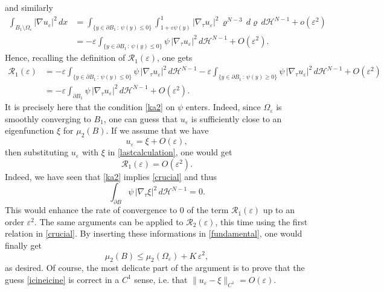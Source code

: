\documentclass{amsart}
\theoremstyle{definition}
\numberwithin{equation}{section}
\begin{document}
and similarly
\[
\begin{split}
\int_{B_1\setminus \Omega_\varepsilon}|\nabla u_\varepsilon|^2\, dx
&=\int_{\{y\in\partial B_1\,:\, \psi(y)\le0 \}}\int_{1+\varepsilon\psi(y)}^1\left|\nabla_\tau u_\varepsilon\right|^2\,\varrho^{N-3}\,d\varrho\,d\mathcal{H}^{N-1}+o(\varepsilon^2)\\
&=-\varepsilon\int_{\{y\in\partial B_1\,:\, \psi(y)\le0 \}}\psi\,|\nabla_\tau u_\varepsilon|^2\, d\mathcal{H}^{N-1}+O(\varepsilon^2).
\end{split}
\]
Hence, recalling the definition of $\mathcal{R}_1(\varepsilon)$, one gets
\begin{equation}
\label{lastcalculation}
\begin{split}
\mathcal{R}_1(\varepsilon) &= -\varepsilon\int_{\{y\in\partial B_1\,:\, \psi(y)\le0 \}}\psi\,|\nabla_\tau u_\varepsilon|^2\, d\mathcal{H}^{N-1}-\varepsilon\int_{\{y\in\partial B_1\,:\, \psi(y)\ge0 \}}\psi\,|\nabla_\tau u_\varepsilon|^2\, d\mathcal{H}^{N-1}+O(\varepsilon^2)\\
&=-\varepsilon \int_{\partial B_1}\psi\,|\nabla_\tau u_\varepsilon|^2\,d\mathcal{H}^{N-1}+ O(\varepsilon^2).
\end{split}
\end{equation}
It is precisely here that the condition \eqref{ka2} on $\psi$ enters.
Indeed, since $\Omega_\varepsilon$ is smoothly converging to $B_1$, one can guess that $u_\varepsilon$ is sufficiently close to an eigenfunction $\xi$ for $\mu_2(B)$. 
If we assume that we have 
\begin{equation}
\label{icineicine}
u_\varepsilon=\xi+O(\varepsilon),
\end{equation}
then substituting $u_\varepsilon$ with $\xi$ in \eqref{lastcalculation}, one would get
\[
\mathcal{R}_1(\varepsilon)=O(\varepsilon^2).
\]
Indeed, we have seen that \eqref{ka2} implies \eqref{crucial} and thus
\[
\int_{\partial B} \psi\,|\nabla_\tau \xi|^2\,d\mathcal{H}^{N-1}=0.
\]
This would enhance the rate of convergence to $0$ of the term $\mathcal{R}_1(\varepsilon)$ up to an order $\varepsilon^2$. The same arguments can be applied to $\mathcal{R}_2(\varepsilon)$, this time using the first relation in \eqref{crucial}. By inserting these informations in \eqref{fundamental}, one would finally get
\[
\mu_2(B)\le \mu_2(\Omega_\varepsilon)+K\,\varepsilon^2,
\]
as desired. Of course, the most delicate part of the argument is to prove that the guess \eqref{icineicine} is correct in a $C^1$ sense, i.e. that $\|u_\varepsilon-\xi\|_{C^1}=O(\varepsilon)$.
\end{document}
